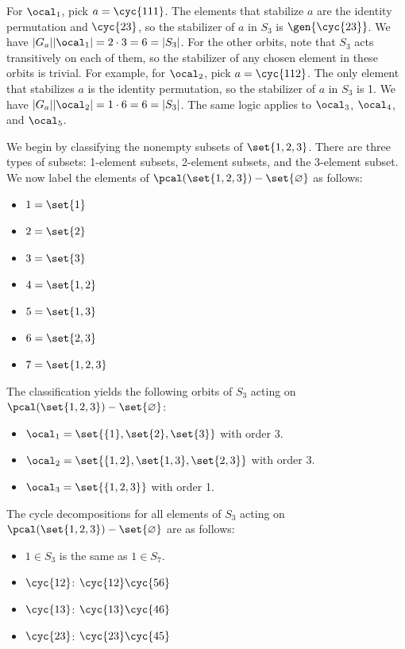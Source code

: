 \begin{solenum}
\begin{itemize}
	\end{itemize}
	For $\ocal_1$, pick $a = \cyc{1 1 1}$.
	The elements that stabilize $a$ are the identity permutation and $\cyc{2 3}$, so the stabilizer of $a$ in $S_3$ is $\gen{\cyc{2 3}}$.
	We have $|G_a||\ocal_1| = 2 \cdot 3 = 6 = |S_3|$.
	For the other orbits, note that $S_3$ acts transitively on each of them, so the stabilizer of any chosen element in these orbits is trivial.
	For example, for $\ocal_2$, pick $a = \cyc{1 1 2}$.
	The only element that stabilizes $a$ is the identity permutation, so the stabilizer of $a$ in $S_3$ is 1.
	We have $|G_a||\ocal_2| = 1 \cdot 6 = 6 = |S_3|$.
	The same logic applies to $\ocal_3$, $\ocal_4$, and $\ocal_5$.
	\item We begin by classifying the nonempty subsets of $\set{1, 2, 3}$.
	There are three types of subsets: 1-element subsets, 2-element subsets, and the 3-element subset.
	We now label the elements of $\pcal(\set{1, 2, 3}) - \set{\varnothing}$ as follows:
    \begin{itemize}
        \item $1 = \set{1}$
        \item $2 = \set{2}$
        \item $3 = \set{3}$
        \item $4 = \set{1, 2}$
        \item $5 = \set{1, 3}$
        \item $6 = \set{2, 3}$
        \item $7 = \set{1, 2, 3}$
    \end{itemize}
	The classification yields the following orbits of $S_3$ acting on $\pcal(\set{1, 2, 3}) - \set{\varnothing}$:
	\begin{itemize}
		\item $\ocal_1 = \set{\{1}, \set{2}, \set{3}\}$ with order 3.
		\item $\ocal_2 = \set{\{1, 2}, \set{1, 3}, \set{2, 3}\}$ with order 3.
		\item $\ocal_3 = \set{\{1, 2, 3}\}$ with order 1.
	\end{itemize}
	The cycle decompositions for all elements of $S_3$ acting on $\pcal(\set{1, 2, 3}) - \set{\varnothing}$ are as follows:
	\begin{itemize}
		\item $1 \in S_3$ is the same as $1 \in S_7$.
		\item $\cyc{1 2}$: $\cyc{1 2}\cyc{5 6}$
		\item $\cyc{1 3}$: $\cyc{1 3}\cyc{4 6}$
		\item $\cyc{2 3}$: $\cyc{2 3}\cyc{4 5}$

\end{itemize}
\end{solenum}
